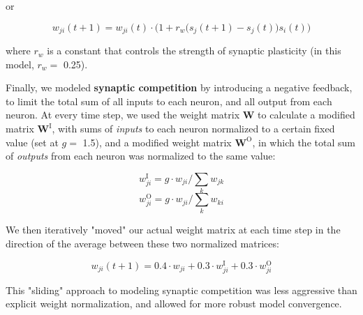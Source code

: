 \documentclass{article}
\begin{document}
or

\[ w_{ji}(t+1) = w_{ji}(t)\cdot\Big(1+r_w\big(s_j(t+1)-s_j(t)\big)s_i(t)\Big) \]

where $r_w$ is a constant that controls the strength of synaptic plasticity (in this model, $r_w=$ 0.25).

Finally, we modeled \textbf{synaptic competition} by introducing a negative feedback, to limit the total sum of all inputs to each neuron, and all output from each neuron. At every time step, we used the weight matrix $\mathbf{W}$ to calculate a modified matrix $\mathbf{W}^\text{I}$, with sums of \textit{inputs} to each neuron normalized to a certain fixed value (set at $g=$ 1.5), and a modified weight matrix $\mathbf{W}^\text{O}$, in which the total sum of \textit{outputs} from each neuron was normalized to the same value: 

\[ w_{ji}^\text{I} = g \cdot w_{ji}/\sum_k{w_{jk}} \]
\[ w_{ji}^\text{O} = g \cdot w_{ji}/\sum_k{w_{ki}} \]

We then iteratively "moved" our actual weight matrix at each time step in the direction of the average between these two normalized matrices:

\[ w_{ji}(t+1) = 0.4 \cdot w_{ji} + 0.3 \cdot w^\text{I}_{ji} + 0.3 \cdot w^\text{O}_{ji} \]

This "sliding" approach to modeling synaptic competition was less aggressive than explicit weight normalization, and allowed for more robust model convergence.
\end{document}
